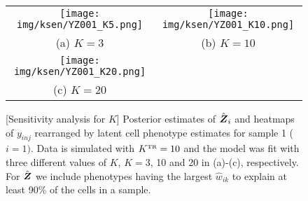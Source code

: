 \documentclass[12pt,]{article}
\newcommand{\true}{{\mbox{\tiny TR}}}
\newcommand{\bZ}{\mbox{\boldmath $Z$}}
\begin{document}



\begin{figure}[t!]
\begin{center}
  \begin{tabular}{cc}
  \texttt{[image: img/ksen/YZ001\_K5.png]}&
  \texttt{[image: img/ksen/YZ001\_K10.png]}\\
  {\small (a) $K=3$} & {\small (b) $K=10$} \\
  \texttt{[image: img/ksen/YZ001\_K20.png]}& \\
  {\small (c) $K=20$} &\\
  \end{tabular}
  \vspace{-0.05in}
  \caption{\small[Sensitivity analysis for $K$] Posterior estimates of
    $\hat{\bZ}_i$ and heatmaps of $y_{inj}$ rearranged by latent cell phenotype
    estimates for sample 1 ($i=1)$. Data is simulated with $K^\true=10$ and the
    model was fit with three different values of $K$, $K=3$, 10 and 20 in
    (a)-(c), respectively.  For $\hat{\bZ}$ we include phenotypes having the
    largest $\hat{w}_{ik}$ to explain at least 90\% of the cells in a sample. }
  \label{fig:ksen-post-Z}
\end{center}
\end{figure}
\end{document}
